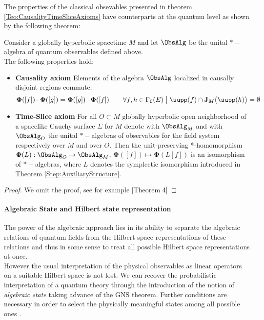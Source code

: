 \documentclass[Main]{subfiles}
\begin{document}
   			The properties of the classical obsevables presented in theorem \ref{Teo:CausalityTimeSliceAxioms} have counterparts at the quantum level as shown by the following theorem:
				\begin{theorem}\label{Teo:QuantumCausalityTimeSliceAxioms}
					Consider a globally hyperbolic spacetime $M$ and let $\ObsAlg$ be the unital $\ast-$algebra of quantum observables defined above.\\
					The following properties hold:
					\begin{itemize}
						\item \textbf{Causality axiom}
							Elements of the algebra $\ObsAlg$ localized in causally disjoint regions commute:
							\begin{displaymath}
								\mathbf{\Phi}([f]) \cdot \mathbf{\Phi}([g]) = \mathbf{\Phi}([g]) \cdot \mathbf{\Phi}([f]) \qquad 
								\forall f,h \in \Gamma_0(E) \; \big\vert \; \supp(f) \cap \textbf{J}_M \big(\supp(h) \big) = \emptyset
							\end{displaymath}
						\item \textbf{Time-Slice axiom}
							For all $O \subset M$ globally hyperbolic open neighborhood of a spacelike Cauchy surface $\Sigma$ for $M$ denote 
							with $\ObsAlg_M$ and with $\ObsAlg_O$ the unital $\ast-$algebras of observables for the field system respectively over $M$ and over $O$.
							Then the unit-preserving *-homomorphism $\mathbf{\Phi}(L):\ObsAlg_O \rightarrow \ObsAlg_M $, $ \mathbf{\Phi}([ f ]) \mapsto \mathbf{\Phi} (L[f])$ is an isomorphism of $\ast-$algebras, where $L$ denotes the symplectic isomorphism introduced in Theorem \ref{Step:AuxiliaryStructure}.
					\end{itemize}
				\end{theorem}
				\begin{proof}
					We omit the proof, see for example \cite{benini}[Theorem 4]
				\end{proof}
	
   		\paragraph{Algebraic State and Hilbert state representation} 
			The power of the algebraic approach lies in its ability to separate the algebraic relations of quantum fields from the Hilbert space representations of these relations and thus in some sense to treat all possible Hilbert space representations at once. \\
			However the usual interpretation of the physical observables as linear operators on a suitable Hilbert space is not lost.
			We can recover the probabilistic interpretation of a quantum theory through the introduction of the notion of \emph{algebraic state} taking advance of the GNS theorem. 
			Further conditions are necessary in order to select the physically meaningful states among all possible ones .
			
\end{document}
